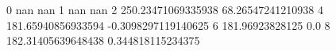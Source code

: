 0 nan nan
1 nan nan
2 250.23471069335938 68.26547241210938
4 181.65940856933594 -0.3098297119140625
6 181.96923828125 0.0
8 182.31405639648438 0.344818115234375
